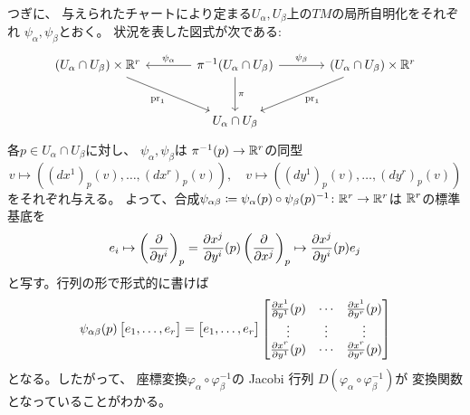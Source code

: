 \documentclass[report]{jlreq}
\begin{document}
\begin{answer}
    つぎに、
    与えられたチャートにより定まる$U_\alpha, U_\beta$上の$TM$の局所自明化をそれぞれ
    $\psi_\alpha, \psi_\beta$とおく。
    状況を表した図式が次である:
    \begin{equation}
        \begin{tikzcd}[column sep=large, row sep=large]
            (U_\alpha \cap U_\beta) \times \R^r \ar{rd}[swap]{\mathrm{pr}_1}
                & \pi^{-1}(U_\alpha \cap U_\beta)
                    \ar{l}[swap]{\psi_\alpha} \ar{d}{\pi} \ar{r}{\psi_\beta}
                & (U_\alpha \cap U_\beta) \times \R^r \ar{ld}{\mathrm{pr}_1} \\
            & U_\alpha \cap U_\beta
        \end{tikzcd}
    \end{equation}
    各$p \in U_\alpha \cap U_\beta$に対し、
    $\psi_\alpha, \psi_\beta$は
    $\pi^{-1}(p) \to \mathbb{R}^r$の同型
    \begin{equation}
        v \mapsto ((dx^1)_p(v), \dots, (dx^r)_p(v)), \quad
        v \mapsto ((dy^1)_p(v), \dots, (dy^r)_p(v))
    \end{equation}
    をそれぞれ与える。
    よって、合成$\psi_{\alpha\beta} \coloneqq
    \psi_\alpha(p) \circ \psi_\beta(p)^{-1} \colon \mathbb{R}^r \to \mathbb{R}^r$は
    $\mathbb{R}^r$の標準基底を
    \begin{equation}
        e_i \mapsto \myparen{\deldel{y^i}}_p
            = \deldel[x^j]{y^i}(p) \myparen{\deldel{x^j}}_p
            \mapsto \deldel[x^j]{y^i}(p) e_j
    \end{equation}
    と写す。行列の形で形式的に書けば
    \begin{equation}
        \psi_{\alpha\beta}(p)
        \begin{bmatrix}
             e_1, \dots, e_r
        \end{bmatrix}
        =
        \begin{bmatrix}
             e_1, \dots, e_r
        \end{bmatrix}
        \begin{bmatrix}
            \deldel[x^1]{y^1}(p)
            &\cdots
            &\deldel[x^1]{y^r}(p) \\
            \vdots &\vdots &\vdots \\
            \deldel[x^r]{y^1}(p)
            &\cdots
            &\deldel[x^r]{y^r}(p)
        \end{bmatrix}
    \end{equation}
    となる。したがって、
    座標変換$\varphi_\alpha \circ \varphi_\beta^{-1}$の Jacobi 行列
    $D(\varphi_\alpha \circ \varphi_\beta^{-1})$が
    変換関数となっていることがわかる。
\end{answer}
\end{document}
